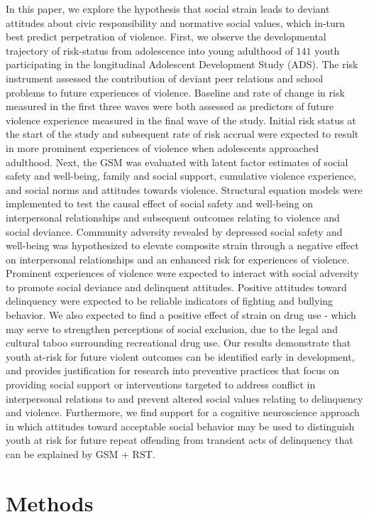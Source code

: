 \documentclass[utf8]{article}
\begin{document}
In this paper, we explore the hypothesis that social strain leads to deviant attitudes about civic responsibility and normative social values, which in-turn best predict perpetration of violence. First, we observe the developmental trajectory of risk-status from adolescence into young adulthood of $141$ youth participating in the longitudinal Adolescent Development Study (ADS). The risk instrument assessed the contribution of deviant peer relations and school problems to future experiences of violence. Baseline and rate of change in risk measured in the first three waves were both assessed as predictors of future violence experience measured in the final wave of the study. Initial risk status at the start of the study and subsequent rate of risk accrual were expected to result in more prominent experiences of violence when adolescents approached adulthood. Next, the GSM was evaluated with latent factor estimates of social safety and well-being, family and social support, cumulative violence experience, and social norms and attitudes towards violence. Structural equation models were implemented to test the causal effect of social safety and well-being on interpersonal relationships and subsequent outcomes relating to violence and social deviance. Community adversity revealed by depressed social safety and well-being was hypothesized to elevate composite strain through a negative effect on interpersonal relationships and an enhanced risk for experiences of violence. Prominent experiences of violence were expected to interact with social adversity to promote social deviance and delinquent attitudes. Positive attitudes toward delinquency were expected to be reliable indicators of fighting and bullying behavior. We also expected to find a positive effect of strain on drug use - which may serve to strengthen perceptions of social exclusion, due to the legal and cultural taboo surrounding recreational drug use. Our results demonstrate that youth at-risk for future violent outcomes can be identified early in development, and provides justification for research into preventive practices that focus on providing social support or interventions targeted to address conflict in interpersonal relations to and prevent altered social values relating to delinquency and violence. Furthermore, we find support for a cognitive neuroscience approach in which attitudes toward acceptable social behavior may be used to distinguish youth at risk for future repeat offending from transient acts of delinquency that can be explained by GSM + RST.
\section{Methods}
\end{document}
